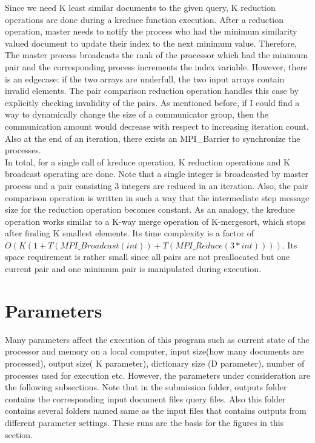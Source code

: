 \documentclass{article}
\begin{document}
\null \qquad Since we need  K least similar documents to the given query, K reduction operations are done during a kreduce function execution. After a reduction operation, master needs to notify the process who had the minimum similarity valued document to update their index to the next minimum value. Therefore, The master process broadcasts the rank of the processor which had the minimum pair and the corresponding process increments the index variable. However, there is an edgecase: if the two arrays are underfull, the two input arrays contain invalid elements. The pair comparison reduction operation handles this case by explicitly checking invalidity of the pairs. As mentioned before, if I could find a way to dynamically change the size of a communicator group, then the communication amount would decrease with respect to increasing iteration count. Also at the end of an iteration, there exists an MPI\_Barrier to synchronize the processes.\\
\null \qquad In total, for a single call of kreduce operation, K reduction operations and K broadcast operating are done. Note that a single integer is broadcasted by master process and a pair consisting 3 integers are reduced in an iteration. Also, the pair comparison operation is written in such a way that the intermediate step message size for the reduction operation becomes constant. As an analogy, the kreduce operation works similar to a K-way merge operation of K-mergesort, which stops after finding K smallest elements. Its time complexity is a factor of $ O( K( 1 + T(MPI\_Broadcast(int)) + T(MPI\_Reduce(3 * int)) ) )$. Its space requirement is rather small since all pairs are not preallocated but one current pair and one minimum pair is manipulated during execution.

\section{Parameters}
\qquad Many parameters affect the execution of this program such as current state of the processor and memory on a local computer, input size(how many documents are processed), output size( K  parameter),  dictionary size (D parameter), number of processes used for execution etc. However, the parameters under consideration are the following subsections. Note that in the submission folder, outputs folder contains the corresponding input document files query files. Also this folder contains several folders named same as the input files that contains outputs from different parameter settings. These runs are the basis for the figures in this section.
\end{document}
